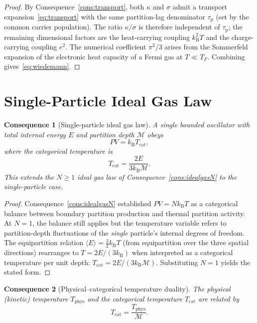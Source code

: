 \documentclass[11pt,twocolumn,a4paper]{article}
\theoremstyle{axiomstyle}
\theoremstyle{conseqstyle}
\newtheorem{consequence}{Consequence}
\theoremstyle{definition}
\theoremstyle{remark}
\newcommand{\kB}{k_{\mathrm{B}}}
\newcommand{\Depth}{\mathcal{M}}
\newcommand{\taup}{\tau_{\mathrm{p}}}
\begin{document}
\begin{proof}
By Consequence~\ref{cons:transport}, both $\kappa$ and $\sigma$ admit a transport expansion~\eqref{eq:transport} with the same partition-lag denominator $\taup$ (set by the common carrier population). The ratio $\kappa/\sigma$ is therefore independent of $\taup$; the remaining dimensional factors are the heat-carrying coupling $\kB^{2}T$ and the charge-carrying coupling $e^{2}$. The numerical coefficient $\pi^{2}/3$ arises from the Sommerfeld expansion \citep{sommerfeld1927,ashcroftmermin1976} of the electronic heat capacity of a Fermi gas at $T\ll T_{F}$. Combining gives~\eqref{eq:wiedemann}.
\end{proof}

\section{Single-Particle Ideal Gas Law}
\label{sec:singlepartgas}

\begin{consequence}[Single-particle ideal gas law]\label{cons:singleparticle}
A single bounded oscillator with total internal energy $E$ and partition depth $\Depth$ obeys
\begin{equation}
PV=\kB T_{\mathrm{cat}},
\end{equation}
where the \emph{categorical temperature} is
\begin{equation}
T_{\mathrm{cat}}=\frac{2E}{3\kB\Depth}.
\end{equation}
This extends the $N\geq 1$ ideal gas law of Consequence~\ref{cons:idealgasN} to the single-particle case.
\end{consequence}

\begin{proof}
Consequence~\ref{cons:idealgasN} established $PV=N\kB T$ as a categorical balance between boundary partition production and thermal partition activity. At $N=1$, the balance still applies but the temperature variable refers to partition-depth fluctuations of the \emph{single} particle's internal degrees of freedom. The equipartition relation $\langle E\rangle=\tfrac{3}{2}\kB T$ (from equipartition over the three spatial directions) rearranges to $T=2E/(3\kB)$ when interpreted as a categorical temperature per unit depth: $T_{\mathrm{cat}}=2E/(3\kB\Depth)$. Substituting $N=1$ yields the stated form.
\end{proof}

\begin{consequence}[Physical--categorical temperature duality]\label{cons:Tduality}
The physical (kinetic) temperature $T_{\mathrm{phys}}$ and the categorical temperature $T_{\mathrm{cat}}$ are related by
\begin{equation}
T_{\mathrm{cat}}=\frac{T_{\mathrm{phys}}}{\Depth}.
\end{equation}
\end{consequence}
\end{document}
